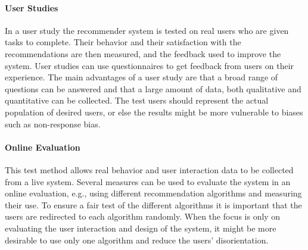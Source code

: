 \paragraph{User Studies} In a user study the recommender system is tested on real users who are given tasks to complete. Their behavior and their satisfaction with the recommendations are then measured, and the feedback used to improve the system. User studies can use questionnaires to get feedback from users on their experience. The main advantages of a user study are that a broad range of questions can be answered and that a large amount of data, both qualitative and quantitative can be collected. The test users should represent the actual population of desired users, or else the results might be more vulnerable to biases such as non-response bias.

\paragraph{Online Evaluation} This test method allows real behavior and user interaction data to be collected from a live system. Several measures can be used to evaluate the system in an online evaluation, e.g., using different recommendation algorithms and measuring their use. To ensure a fair test of the different algorithms it is important that the users are redirected to each algorithm randomly. When the focus is only on evaluating the user interaction and design of the system, it might be more desirable to use only one algorithm and reduce the users' disorientation. 

\cleardoublepage